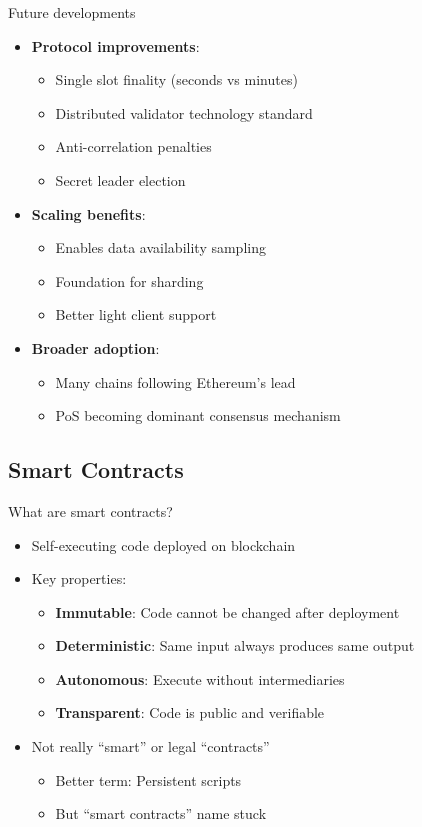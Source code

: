 \documentclass[aspectratio=169, lualatex, handout]{beamer}
\begin{document}
\begin{frame}{Future developments}
	\begin{itemize}
		\item \textbf{Protocol improvements}:
		      \begin{itemize}
			      \item Single slot finality (seconds vs minutes)
			      \item Distributed validator technology standard
			      \item Anti-correlation penalties
			      \item Secret leader election
		      \end{itemize}
		\item \textbf{Scaling benefits}:
		      \begin{itemize}
			      \item Enables data availability sampling
			      \item Foundation for sharding
			      \item Better light client support
		      \end{itemize}
		\item \textbf{Broader adoption}:
		      \begin{itemize}
			      \item Many chains following Ethereum's lead
			      \item PoS becoming dominant consensus mechanism
		      \end{itemize}
	\end{itemize}
\end{frame}

\subsection{Smart Contracts}

\begin{frame}{What are smart contracts?}
	\begin{itemize}
		\item Self-executing code deployed on blockchain
		\item Key properties:
		      \begin{itemize}
			      \item \textbf{Immutable}: Code cannot be changed after deployment
			      \item \textbf{Deterministic}: Same input always produces same output
			      \item \textbf{Autonomous}: Execute without intermediaries
			      \item \textbf{Transparent}: Code is public and verifiable
		      \end{itemize}
		\item Not really ``smart'' or legal ``contracts''
		      \begin{itemize}
			      \item Better term: Persistent scripts
			      \item But ``smart contracts'' name stuck
		      \end{itemize}
	\end{itemize}
\end{frame}
\end{document}
